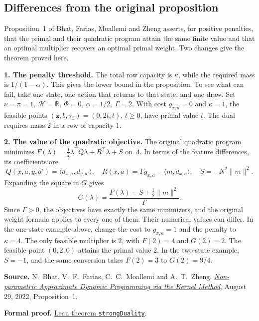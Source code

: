 \documentclass[12pt,a4paper]{article}
\numberwithin{equation}{section}
\newcommand{\ip}[2]{\langle #1,#2\rangle}
\newcommand{\norm}[1]{\lVert #1\rVert}
\newcommand{\R}{\mathbb R}
\newcommand{\lead}[1]{\par\smallskip\noindent\textbf{#1}\enspace}
\begin{document}
\subsection*{Differences from the original proposition}
Proposition~1 of Bhat, Farias, Moallemi and Zheng asserts, for positive
penalties, that the primal and their quadratic program attain the same
finite value and that an optimal multiplier recovers an optimal primal
weight. Two changes give the theorem proved here.

\lead{1. The penalty threshold.}
The total row capacity is \(\kappa\), while the required mass is \(1/(1-\alpha)\).
This gives the lower bound in the proposition. To see what can fail, take one
state, one action that returns to that state, and one draw. Set
\(\nu=\pi=1,\ \mathcal H=\R,\ \Phi=0,\ \alpha=1/2,\ \Gamma=2\).
With cost \(g_{x,a}=0\) and \(\kappa=1\), the feasible points
\((\mathbf z,b,s_x)=(0,2t,t)\), \(t\ge0\), have primal value \(t\).
The dual requires mass \(2\) in a row of capacity \(1\).

\lead{2. The value of the quadratic objective.}
The original quadratic program minimizes
\(F(\lambda)=\tfrac12\lambda^\top Q\lambda+R^\top\lambda+S\) on
\(\Lambda\). In terms of the feature differences, its coefficients are
\[
 Q(x,a,y,a')=\ip{d_{x,a}}{d_{y,a'}},\quad
 R(x,a)=\Gamma g_{x,a}-\ip{m}{d_{x,a}},\quad S=-N^2\norm{m}^2 .
\]
Expanding the square in \(G\) gives
\[
     G(\lambda)=\frac{F(\lambda)-S+\tfrac12\norm{m}^2}{\Gamma}.
\]
Since \(\Gamma>0\), the objectives have exactly the same minimizers, and
the original weight formula applies to every one of them. Their numerical
values can differ. In the one-state example above, change the cost to
\(g_{x,a}=1\) and the penalty to \(\kappa=4\). The only feasible multiplier is
\(2\), with \(F(2)=4\) and \(G(2)=2\). The feasible point \((0,2,0)\)
attains the primal value \(2\). In the two-state example, \(S=-1\), and the
same conversion takes \(F(2)=3\) to \(G(2)=9/4\).

\smallskip
{\small
\textbf{Source.} N.~Bhat, V.~F.~Farias, C.~C.~Moallemi and A.~T.~Zheng,
\href{https://moallemi.com/ciamac/papers/kernel-adp-2012.pdf\#page=8}{\emph{Non-parametric Approximate Dynamic Programming via the Kernel Method}},
August 29, 2022, Proposition~1.\par
\textbf{Formal proof.} \href{https://github.com/nikhilpb/kadp/blob/main/Kadp/PrimalAttainment.lean}{Lean theorem \texttt{strongDuality}}.
}
\end{document}
